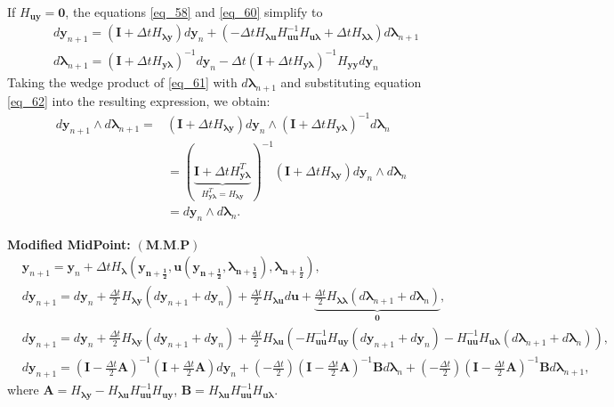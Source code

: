 \documentclass[a4paper, 10pt]{article}
\begin{document}
If $H_{\bm{uy}} = \bm{0}$, the equations \eqref{eq_58} and \eqref{eq_60} simplify to
\begin{align}
      & d\bm{y}_{n+1} = (\bm{I} + \Delta{t}H_{\bm{\lambda y}}) d\bm{y}_{n} + (-\Delta{t}H_{\bm{\lambda u}}H^{-1}_{\bm{uu}}H_{\bm{u\lambda}} + \Delta{t} H_{\bm{\lambda\lambda}}) d\bm{\lambda}_{n+1} \label{eq_61}  \\
      & d\bm{\lambda}_{n+1} = (\bm{I} + \Delta{t}H_{\bm{y\lambda}})^{-1} d\bm{y}_{n} -\Delta{t}(\bm{I} + \Delta{t}H_{\bm{y\lambda}})^{-1}H_{\bm{yy}}d\bm{y}_n \label{eq_62}
\end{align}
Taking the wedge product of \eqref{eq_61} with $d\bm{\lambda}_{n+1}$ and substituting equation \eqref{eq_62} into the resulting expression, we obtain:
\begin{equation}
\begin{aligned}
    d\bm{y}_{n+1} \wedge d\bm{\lambda}_{n+1} = &  (\bm{I} + \Delta{t}H_{\bm{\lambda y}}) d\bm{y}_{n} \wedge  (\bm{I} + \Delta{t}H_{\bm{y\lambda}})^{-1} d\bm{\lambda}_{n}   \\
    & = (\underbrace{\bm{I} + \Delta{t}H_{\bm{y\lambda}}^{T}}_{H_{\bm{y\lambda}}^{T}=H_{\bm{\lambda y}}})^{-1} (\bm{I} + \Delta{t}H_{\bm{\lambda y}}) d\bm{y}_{n} \wedge d\bm{\lambda}_n \\
    & = d\bm{y}_n \wedge d\bm{\lambda}_n.
\end{aligned}
\label{eq:equation6}
\end{equation}

\textbf{Modified MidPoint:} $(\bm{M.M.P})$
\begin{align}
    & \bm{y}_{n+1} = \bm{y}_{n} + \Delta{t}H_{\bm{\lambda}}(\bm{y_{n+\frac{1}{2}}}, \bm{u}(\bm{y_{n+\frac{1}{2}}},\bm{\lambda_{n+\frac{1}{2}}}),\bm{\lambda_{n+\frac{1}{2}}}), \nonumber \\
    & d\bm{y}_{n+1} = d\bm{y}_{n} + \tfrac{\Delta{t}}{2}H_{\bm{\lambda}\bm{y}}(d\bm{y}_{n+1}+d\bm{y}_{n})+ \tfrac{\Delta{t}}{2}H_{\bm{\lambda}\bm{u}}d\bm{u}+ \underbrace{\tfrac{\Delta{t}}{2}H_{\bm{\lambda}\bm{\lambda}}(d\bm{\lambda}_{n+1}+d\bm{\lambda}_{n})}_{\bm{0}}, \nonumber \\
    & d\bm{y}_{n+1} = d\bm{y}_{n}  +  \tfrac{\Delta{t}}{2}H_{\bm{\lambda}\bm{y}}(d\bm{y}_{n+1}+d\bm{y}_{n})
    + \tfrac{\Delta{t}}{2}H_{\bm{\lambda}\bm{u}}\!\left( -H_{\bm{uu}}^{-1}H_{\bm{uy}}(d\bm{y}_{n+1}+d\bm{y}_{n})-H_{\bm{uu}}^{-1}H_{\bm{u\lambda}}(d\bm{\lambda}_{n+1}+d\bm{\lambda}_{n}) \right), \nonumber \\
    & \boxed{ d\bm{y}_{n+1} = (\bm{I}-\tfrac{\Delta{t}}{2}\bm{A})^{-1}(\bm{I}+\tfrac{\Delta{t}}{2}\bm{A})d\bm{y}_{n} + (-\tfrac{\Delta{t}}{2}) (\bm{I}-\tfrac{\Delta{t}}{2}\bm{A})^{-1}\bm{B}d\bm{\lambda}_{n} +
      (-\tfrac{\Delta{t}}{2}) (\bm{I}-\tfrac{\Delta{t}}{2}\bm{A})^{-1}\bm{B}d\bm{\lambda}_{n+1},} \label{m.m.p_eq_1}
\end{align}
where $\bm{A} = H_{\bm{\lambda y}} - H_{\bm{\lambda u}}H_{\bm{uu}}^{-1}H_{\bm{uy}}$, $\bm{B} = H_{\bm{\lambda u}}H_{\bm{uu}}^{-1}H_{\bm{u\lambda}}$.
\end{document}
